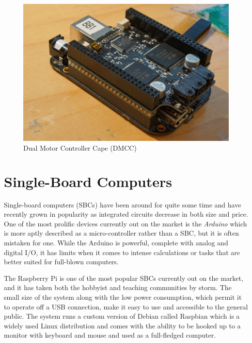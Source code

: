 \documentclass[12pt,oneside,final]{siuethesis}
\theoremstyle{definition}
\begin{document}
\begin{figure}[htbp!]
\centering
\includegraphics[scale=.15,keepaspectratio=true]{./images/DMCC.jpg}
\caption{Dual Motor Controller Cape (DMCC)}
\label{fig:DMCC}
\end{figure}

\section{Single-Board Computers} 

Single-board computers (SBCs) have been around for quite some time and have recently grown in popularity as integrated circuits decrease in both size and price. One of the most prolific devices currently out on the market is the \emph{Arduino} which is more aptly described as a micro-controller rather than a SBC, but it is often mistaken for one.  While the Arduino is powerful, complete with analog and digital I/O, it has limits when it comes to intense calculations or tasks that are better suited for full-blown computers. 

The Raspberry Pi is one of the most popular SBCs currently out on the market, and it has taken both the hobbyist and teaching communities by storm. The small size of the system along with the low power consumption, which permit it to operate off a USB connection, make it easy to use and accessible to the general public. The system runs a custom version of Debian called Raspbian which is a widely used Linux distribution and comes with the ability to be hooked up to a monitor with keyboard and mouse and used as a full-fledged computer. 
	
\end{document}

